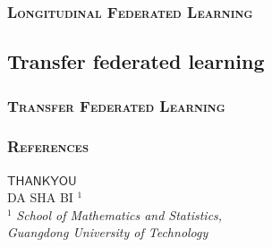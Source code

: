 \documentclass[11pt]{beamer}
\begin{document}
\begin{frame}
	\frametitle{\textsc{Longitudinal Federated Learning}}
	
	
\end{frame}

\begin{frame}
	\subsection{Transfer federated learning}
	\frametitle{\textsc{Transfer Federated Learning}}
\end{frame}

\begin{frame}
	\frametitle{\textsc{References}}
	\Background
\end{frame}
\begin{frame}[plain]
	\Background
	\begin{center}
		{\Huge $\mathsf{THANK YOU}$}\\
		\vspace{5pt}
		DA SHA BI $^{1}$ \\
		\vspace{5pt}
		$^{1}$ \textit{School of Mathematics and Statistics,\\ Guangdong University of Technology}
	\end{center}
	
\end{frame}
\end{document}
